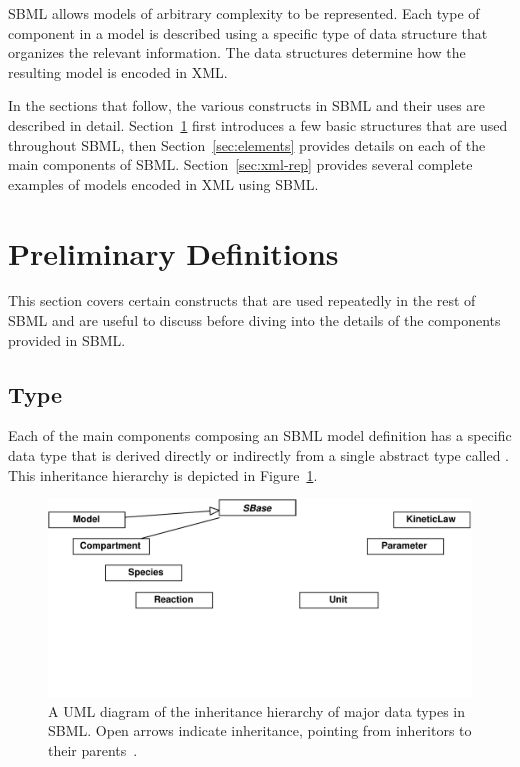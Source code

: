 \documentclass[10pt]{cekarticle}
\newcommand{\vref}[1]{\ref{#1}}
\newcommand{\changed}[1]{\textcolor{BrickRed}{#1}}
\begin{document}
SBML allows models of arbitrary complexity to be represented.  Each type of
component in a model is described using a specific type of data structure
that organizes the relevant information.  The data structures determine how
the resulting model is encoded in XML.

In the sections that follow, the various constructs in SBML and their uses
are described in detail.  Section~\ref{sec:general} first introduces a few
basic structures that are used throughout SBML, then
Section~\ref{sec:elements} provides details on each of the main components
of SBML.  Section~\ref{sec:xml-rep} provides several complete examples of
models encoded in XML using SBML.


\section{Preliminary Definitions}
\label{sec:general}

This section covers certain constructs that are used repeatedly in the rest
of SBML and are useful to discuss before diving into the details of the
components provided in SBML.

\subsection{Type }
\label{sec:sbase}

Each of the main components composing an SBML model definition has a
specific data type that is derived directly or indirectly from a single
\changed{abstract} type called .  This inheritance hierarchy
is depicted in Figure~\vref{fig:top-level}.

\begin{figure}[ht]
  \centering
  \includegraphics[scale = 0.7]{top-level}
  \caption{A UML diagram of the inheritance hierarchy of major data types
    in SBML.  Open arrows indicate inheritance, pointing from inheritors to 
    their parents~\citep{eriksson:1998,oestereich:1999}.}
  \label{fig:top-level}
\end{figure}
\end{document}
